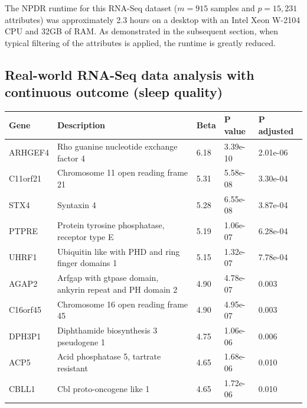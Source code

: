 \documentclass[10pt]{article}
\begin{document}
The NPDR runtime for this RNA-Seq dataset ($m=915$ samples and $p=15,231$ attributes) was approximately 2.3 hours on a desktop with an Intel Xeon W-2104 CPU and 32GB of RAM.
As demonstrated in the subsequent section, when typical filtering of the attributes is applied, the runtime is greatly reduced.


\subsection{Real-world RNA-Seq data analysis with continuous outcome (sleep quality)}

\begin{table}[]
{\small
\begin{tabular}{p{1.3cm}p{7.2cm}C{0.8cm}C{1.2cm}C{1.5cm}}
Gene     & Description                                                & Beta & P value & P adjusted \\
\hline
ARHGEF4  & Rho guanine nucleotide exchange factor 4                   & 6.18          & 3.39e-10      & 2.01e-06       \\
C11orf21 & Chromosome 11 open reading frame 21                        & 5.31          & 5.58e-08      & 3.30e-04       \\
STX4     & Syntaxin 4                                                 & 5.28          & 6.55e-08      & 3.87e-04       \\
PTPRE    & Protein tyrosine phosphatase, receptor type E              & 5.19          & 1.06e-07      & 6.28e-04       \\
UHRF1    & Ubiquitin like with PHD and ring finger domains 1          & 5.15          & 1.32e-07      & 7.78e-04       \\
AGAP2    & Arfgap with gtpase domain, ankyrin repeat and PH domain 2  & 4.90          & 4.78e-07      & 0.003          \\
C16orf45 & Chromosome 16 open reading frame 45                        & 4.90          & 4.95e-07      & 0.003          \\
DPH3P1   & Diphthamide biosynthesis 3 pseudogene 1                    & 4.75          & 1.06e-06      & 0.006          \\
ACP5     & Acid phosphatase 5, tartrate resistant                     & 4.65          & 1.68e-06      & 0.010          \\
CBLL1    & Cbl proto-oncogene like 1                                  & 4.65          & 1.72e-06      & 0.010          \\

\end{tabular}}
\end{table}
\end{document}
